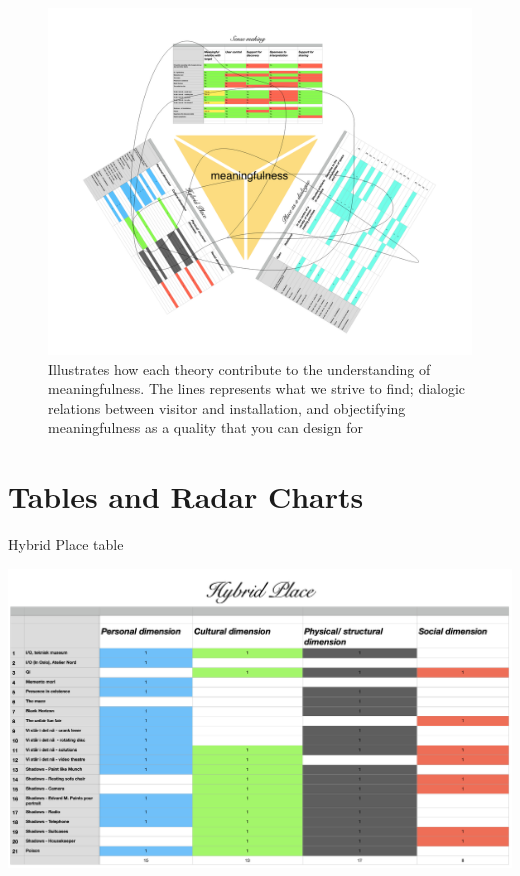 \begin{figure}[H]
\includegraphics[width=14cm]{pictures/analysis/table_triangle.png}
\caption{Illustrates how each theory contribute to the understanding of meaningfulness. The lines represents what we strive to find; dialogic relations between visitor and installation, and objectifying meaningfulness as a quality that you can design for}
\end{figure}

\section{Tables and Radar Charts}

\begin{table}[H]
  \caption{Hybrid Place table}
  \includegraphics[width=20cm, angle=90]{pictures/analysis/hybrid.png}
\end{table}

